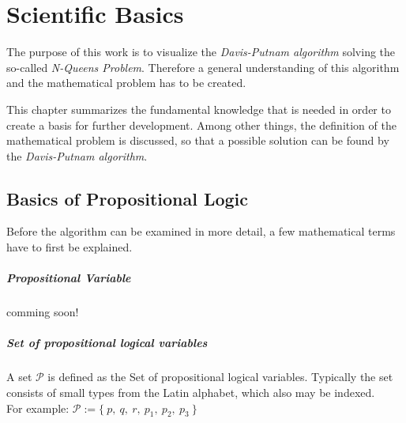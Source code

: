 

\chapter{Scientific Basics}
\label{ch:sciBasics}
The purpose of this work is to visualize the \textit{Davis-Putnam algorithm} solving the so-called \textit{N-Queens Problem}. Therefore a general understanding of this algorithm and the mathematical problem has to be created.

This chapter summarizes the fundamental knowledge that is needed in order to create a basis for further development. Among other things, the definition of the mathematical problem is discussed, so that a possible solution can be found by the \textit{Davis-Putnam algorithm}.

\section{Basics of Propositional Logic}
\label{sec:sciProLogic}
Before the algorithm can be examined in more detail, a few mathematical terms have to first be explained.

\paragraph{Propositional Variable} comming soon!

\paragraph{Set of propositional logical variables}
A set $\mathcal{P}$ is defined as the Set of propositional logical variables. Typically the set consists of small types from the Latin alphabet, which also may be indexed.\\
For example: $\mathcal{P} := \{\ p,\ q,\ r,\ p_1,\ p_2,\ p_3\ \}$ 

